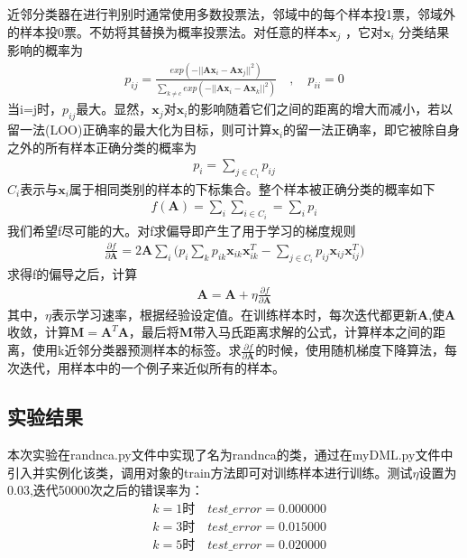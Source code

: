 \documentclass[a4paper,UTF8]{article}
\theoremstyle{definition}
\begin{document}
		
		近邻分类器在进行判别时通常使用多数投票法，邻域中的每个样本投1票，邻域外的样本投0票。不妨将其替换为概率投票法。对任意的样本$\textbf{x}_j$ ，它对$\textbf{x}_i$ 分类结果影响的概率为
		\begin{align}
		p_{ij}=\frac{exp(-||\textbf{Ax}_i-\textbf{Ax}_j||^2)}{\sum_{k\not=c}exp(-||\textbf{Ax}_i-\textbf{Ax}_k||^2)} \quad  ,\quad   p_{ii}=0 
		\end{align}
		当i=j时，$p_{ij}$最大。显然，$\textbf{x}_j$对$\textbf{x}_i$的影响随着它们之间的距离的增大而减小，若以留一法(LOO)正确率的最大化为目标，则可计算$\textbf{x}_i$的留一法正确率，即它被除自身之外的所有样本正确分类的概率为
		\begin{align}
		p_i=\sum_{j\in C_i}p_{ij} 
		\end{align}
		$C_i$表示与$\textbf{x}_i$属于相同类别的样本的下标集合。整个样本被正确分类的概率如下
		\begin{align}
		f(\textbf{A})=\sum_i \sum_{i\in C_i}=\sum_ip_i
		\end{align}
		我们希望f尽可能的大。对f求偏导即产生了用于学习的梯度规则
		\begin{align}
		\frac{\partial f}{\partial \textbf{A}}=2\textbf{A}\sum_i \bigg(p_i\sum_k p_{ik}\textbf{x}_{ik}\textbf{x}_{ik}^T - \sum_{j\in C_i}p_{ij}\textbf{x}_{ij}\textbf{x}_{ij}^T \bigg)
		\end{align}
		求得f的偏导之后，计算
		\begin{align}
		\textbf{A}=\textbf{A}+\eta \frac{\partial f}{\partial \textbf{A}}
		\end{align}
		其中，$\eta$表示学习速率，根据经验设定值。在训练样本时，每次迭代都更新\textbf{A},使\textbf{A}收敛，计算$\textbf{M}=\textbf{A}^T\textbf{A}$，最后将\textbf{M}带入马氏距离求解的公式，计算样本之间的距离，使用k近邻分类器预测样本的标签。求$\frac{\partial f}{\partial \textbf{A}}$的时候，使用随机梯度下降算法，每次迭代，用样本中的一个例子来近似所有的样本\cite{周志华2016机器学习}。
	\subsection*{实验结果}
		本次实验在randnca.py文件中实现了名为randnca的类，通过在myDML.py文件中引入并实例化该类，调用对象的train方法即可对训练样本进行训练。测试$\eta$设置为0.03,迭代50000次之后的错误率为：
		\begin{align*}
		&k=1\mbox{时} \quad test\_error=0.000000 \\	
		&k=3\mbox{时} \quad test\_error=0.015000 \\
		&k=5\mbox{时} \quad test\_error=0.020000 \\
		\end{align*}		
		
\end{document}
